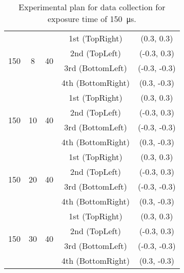 \begin{table}[ht]
{\begin{tabular}{ccccc}
                \midrule

                \multirow{4}{*}{150} & \multirow{4}{*}{8} & \multirow{4}{*}{40} & 1st (\textsf{TopRight}) & (0.3, 0.3) \\
                & & & 2nd (\textsf{TopLeft}) & (-0.3, 0.3) \\
                & & & 3rd (\textsf{BottomLeft}) & (-0.3, -0.3) \\
                & & & 4th (\textsf{BottomRight}) & (0.3, -0.3) \\

                \midrule

                \multirow{4}{*}{150} & \multirow{4}{*}{10} & \multirow{4}{*}{40} & 1st (\textsf{TopRight}) & (0.3, 0.3) \\
                & & & 2nd (\textsf{TopLeft}) & (-0.3, 0.3) \\
                & & & 3rd (\textsf{BottomLeft}) & (-0.3, -0.3) \\
                & & & 4th (\textsf{BottomRight}) & (0.3, -0.3) \\

                \midrule

                \multirow{4}{*}{150} & \multirow{4}{*}{20} & \multirow{4}{*}{40} & 1st (\textsf{TopRight}) & (0.3, 0.3) \\
                & & & 2nd (\textsf{TopLeft}) & (-0.3, 0.3) \\
                & & & 3rd (\textsf{BottomLeft}) & (-0.3, -0.3) \\
                & & & 4th (\textsf{BottomRight}) & (0.3, -0.3) \\
                
                \midrule

                \multirow{4}{*}{150} & \multirow{4}{*}{30} & \multirow{4}{*}{40} & 1st (\textsf{TopRight}) & (0.3, 0.3) \\
                & & & 2nd (\textsf{TopLeft}) & (-0.3, 0.3) \\
                & & & 3rd (\textsf{BottomLeft}) & (-0.3, -0.3) \\
                & & & 4th (\textsf{BottomRight}) & (0.3, -0.3) \\
                \bottomrule
            \end{tabular}
            }
            \caption{Experimental plan for data collection for exposure time of \SI{150}{\micro\second}.}
            \label{table:exp_plan_gain}
        \end{table}
    
